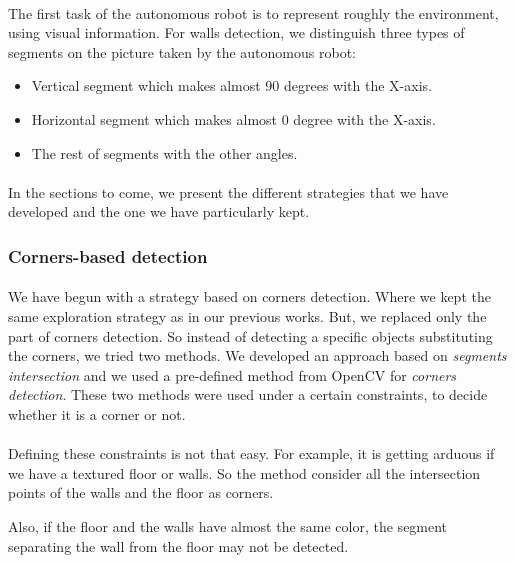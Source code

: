 \documentclass[12pt]{report}
\begin{document}
	 \paragraph{}
	 The first task of the autonomous robot is to represent roughly the environment, using visual information. For walls detection, we distinguish three types of segments on the picture taken by the autonomous robot:
	 \begin{itemize}
	 	\item Vertical segment which makes almost 90 degrees with the X-axis.
	 	\item Horizontal segment which makes almost 0 degree with the  X-axis.
	 	\item The rest of segments with the other angles.
	 \end{itemize} 
	 
	 
	 \paragraph{}
	 In the sections to come, we present the different strategies that we have developed and the one we have particularly kept.
	 
	 \subsubsection{Corners-based detection}
	 \paragraph{}
	 We have begun with a strategy based on corners detection. Where we kept the same exploration strategy as in our previous works. But, we replaced only the part of corners detection. So instead of detecting a specific objects substituting the corners, we tried two methods. We developed an approach based on \textit{segments intersection} and we used a pre-defined  method from OpenCV for \textit{corners detection}. These two methods were used under a certain constraints, to decide whether it is a corner or not.
	 \paragraph{}
	 Defining these constraints is not that easy. For example, it is getting arduous if we have a textured floor or walls. So the method consider all the intersection points of the walls and the floor as corners. 
	
	 Also, if the floor and the walls have almost the same color, the segment separating the wall from the floor may not be detected.
	 
\end{document}
